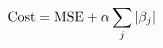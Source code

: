 \documentclass[preview]{standalone}
\begin{document}
\begin{align*}
\special{dvisvgm:raw <g id='unique000'>}\text{Cost} = \text{MSE} + \alpha \sum_j |\beta_j|\special{dvisvgm:raw </g>}
\end{align*}
\end{document}
